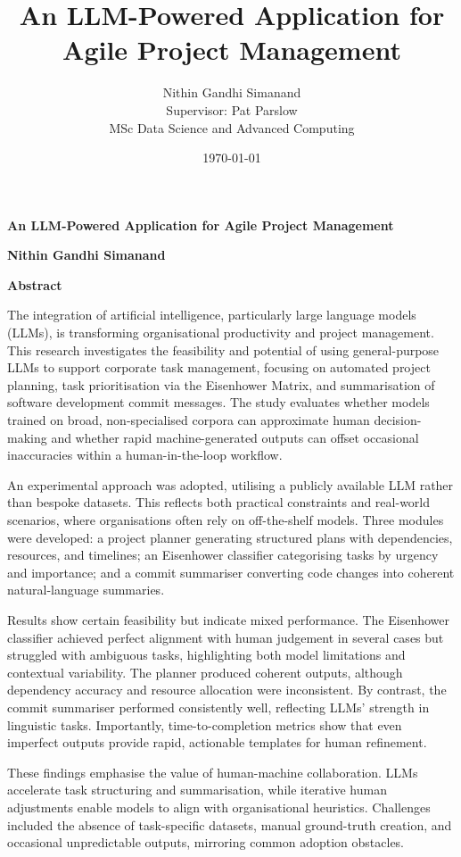 \documentclass{report}
\title{\textbf{An LLM-Powered Application for Agile Project Management}}
\author{Nithin Gandhi Simanand \\ Supervisor: Pat Parslow \\ MSc Data Science and Advanced Computing}
\date{\today}
\begin{document}
\maketitle

\thispagestyle{plain}
\begin{center}
    \Large
    \textbf{An LLM-Powered Application for Agile Project Management}
        
    \vspace{0.4cm}
    \textbf{Nithin Gandhi Simanand}
       
    \vspace{0.9cm}
    \textbf{Abstract}
\end{center}
The integration of artificial intelligence, particularly large language models (LLMs), is transforming organisational productivity and project management. 
This research investigates the feasibility and potential of using general-purpose LLMs to support corporate task management, focusing on automated project planning, task prioritisation via the Eisenhower Matrix, and summarisation of software development commit messages. 
The study evaluates whether models trained on broad, non-specialised corpora can approximate human decision-making and whether rapid machine-generated outputs can offset occasional inaccuracies within a human-in-the-loop workflow.

An experimental approach was adopted, utilising a publicly available LLM rather than bespoke datasets. 
This reflects both practical constraints and real-world scenarios, where organisations often rely on off-the-shelf models. 
Three modules were developed: a project planner generating structured plans with dependencies, resources, and timelines; an Eisenhower classifier categorising tasks by urgency and importance; and a commit summariser converting code changes into coherent natural-language summaries.

Results show certain feasibility but indicate mixed performance. 
The Eisenhower classifier achieved perfect alignment with human judgement in several cases but struggled with ambiguous tasks, highlighting both model limitations and contextual variability. 
The planner produced coherent outputs, although dependency accuracy and resource allocation were inconsistent. 
By contrast, the commit summariser performed consistently well, reflecting LLMs' strength in linguistic tasks. Importantly, time-to-completion metrics show that even imperfect outputs provide rapid, actionable templates for human refinement.

These findings emphasise the value of human-machine collaboration. 
LLMs accelerate task structuring and summarisation, while iterative human adjustments enable models to align with organisational heuristics. 
Challenges included the absence of task-specific datasets, manual ground-truth creation, and occasional unpredictable outputs, mirroring common adoption obstacles.
\end{document}
